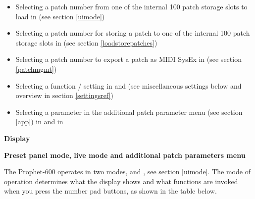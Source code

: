 \documentclass[landscape, 11pt, oneside, twoside]{report}
\newenvironment{flowtext}{\addmargin[0cm]{0cm}}{\endaddmargin} %
\begin{document}
\begin{flowtext}
\begin{itemize}
  \item Selecting a patch number from one of the internal 100 patch storage slots to load in \presetpatch  (see section \ref{uimode})
  \item Selecting a patch number for storing a patch to one of the internal 100 patch storage slots in \storagemode (see section \ref{loadstorepatches})
  \item Selecting a patch number to export a patch as MIDI SysEx in \patchmgmt (see section \ref{patchmgmt})
  \item Selecting a function / setting in \shiftmode and \shiftlock (see miscellaneous settings below and overview in section \ref{settingsref})  
  \item Selecting a parameter in the additional patch parameter menu (see section \ref{app}) in \presetpanel and in \livemode
\end{itemize} 

\pagebreak

\textbf{Display}



\pagebreak

\textbf{Preset panel mode, live mode and additional patch parameters menu}\label{app}

The Prophet-600 operates in two modes, \presetmode and \livemode, see section \ref{uimode}. The mode of operation determines what the display shows and what functions are invoked when you press the number pad buttons, as shown in the table below.

\end{flowtext}
\end{document}
